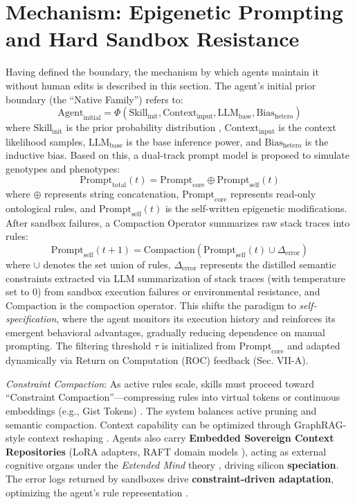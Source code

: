 \documentclass[10pt,journal,compsoc]{IEEEtran}
\begin{document}
\section{Mechanism: Epigenetic Prompting and Hard Sandbox Resistance}
Having defined the boundary, the mechanism by which agents maintain it without human edits is described in this section. The agent's initial prior boundary (the ``Native Family'') refers to:
\begin{equation}
\text{Agent}_{\text{initial}} = \Phi(\text{Skill}_{\text{init}}, \text{Context}_{\text{input}}, \text{LLM}_{\text{base}}, \text{Bias}_{\text{hetero}})
\end{equation}
where $\text{Skill}_{\text{init}}$ is the prior probability distribution \cite{xie2021}, $\text{Context}_{\text{input}}$ is the context likelihood samples, $\text{LLM}_{\text{base}}$ is the base inference power, and $\text{Bias}_{\text{hetero}}$ is the inductive bias. Based on this, a dual-track prompt model is proposed to simulate genotypes and phenotypes:
\begin{equation}
\text{Prompt}_{\text{total}}(t) = \text{Prompt}_{\text{core}} \oplus \text{Prompt}_{\text{self}}(t)
\end{equation}
where $\oplus$ represents string concatenation, $\text{Prompt}_{\text{core}}$ represents read-only ontological rules, and $\text{Prompt}_{\text{self}}(t)$ is the self-written epigenetic modifications. After sandbox failures, a Compaction Operator summarizes raw stack traces into rules:
\begin{equation}
\text{Prompt}_{\text{self}}(t+1) = \text{Compaction}(\text{Prompt}_{\text{self}}(t) \cup \Delta_{\text{error}})
\end{equation}
where $\cup$ denotes the set union of rules, $\Delta_{\text{error}}$ represents the distilled semantic constraints extracted via LLM summarization of stack traces (with temperature set to 0) from sandbox execution failures or environmental resistance, and $\text{Compaction}$ is the compaction operator. This shifts the paradigm to \textit{self-specification}, where the agent monitors its execution history and reinforces its emergent behavioral advantages, gradually reducing dependence on manual prompting. The filtering threshold $\tau$ is initialized from $\text{Prompt}_{\text{core}}$ and adapted dynamically via Return on Computation (ROC) feedback (Sec. VII-A).

\textit{Constraint Compaction}: As active rules scale, skills must proceed toward ``Constraint Compaction''---compressing rules into virtual tokens or continuous embeddings (e.g., Gist Tokens) \cite{mu2023}. The system balances active pruning and semantic compaction. Context capability can be optimized through GraphRAG-style context reshaping \cite{edge2024}. Agents also carry \textbf{Embedded Sovereign Context Repositories} (LoRA adapters, RAFT domain models \cite{zhang2024}), acting as external cognitive organs under the \textit{Extended Mind} theory \cite{clark1998}, driving silicon \textbf{speciation}. The error logs returned by sandboxes drive \textbf{constraint-driven adaptation}, optimizing the agent's rule representation \cite{bak1996}.
\end{document}
